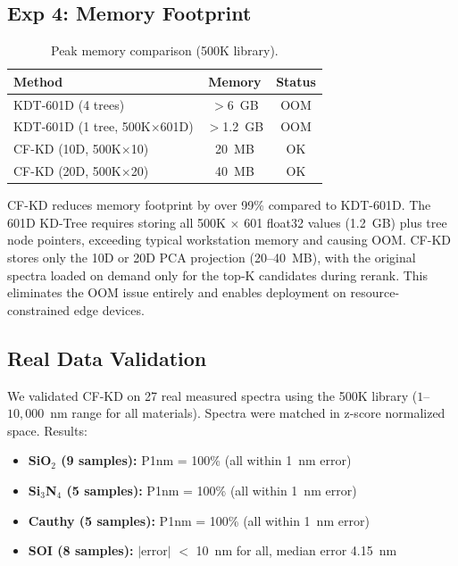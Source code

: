 \documentclass[final,5p,times]{elsarticle}
\begin{document}
\subsection{Exp 4: Memory Footprint}

\begin{table}[H]
\centering
\caption{Peak memory comparison (500K library).}
\label{tab:memory}
\begin{tabular}{lcc}
\toprule
Method & Memory & Status \\
\midrule
KDT-601D (4 trees) & $>$6~GB & OOM \\
KDT-601D (1 tree, 500K$\times$601D) & $>$1.2~GB & OOM \\
CF-KD (10D, 500K$\times$10) & 20~MB & OK \\
CF-KD (20D, 500K$\times$20) & 40~MB & OK \\
\bottomrule
\end{tabular}
\end{table}

CF-KD reduces memory footprint by over 99\% compared to KDT-601D. The 601D KD-Tree requires storing all 500K $\times$ 601 float32 values (1.2~GB) plus tree node pointers, exceeding typical workstation memory and causing OOM. CF-KD stores only the 10D or 20D PCA projection (20--40~MB), with the original spectra loaded on demand only for the top-K candidates during rerank. This eliminates the OOM issue entirely and enables deployment on resource-constrained edge devices.

\subsection{Real Data Validation}

We validated CF-KD on 27 real measured spectra using the 500K library ($1$--$10{,}000$~nm range for all materials). Spectra were matched in z-score normalized space. Results:

\begin{itemize}
\item \textbf{SiO$_2$ (9 samples):} P1nm = 100\% (all within 1~nm error)
\item \textbf{Si$_3$N$_4$ (5 samples):} P1nm = 100\% (all within 1~nm error)
\item \textbf{Cauthy (5 samples):} P1nm = 100\% (all within 1~nm error)
\item \textbf{SOI (8 samples):} $|$error$|$ $<$ 10~nm for all, median error 4.15~nm
\end{itemize}
\end{document}
